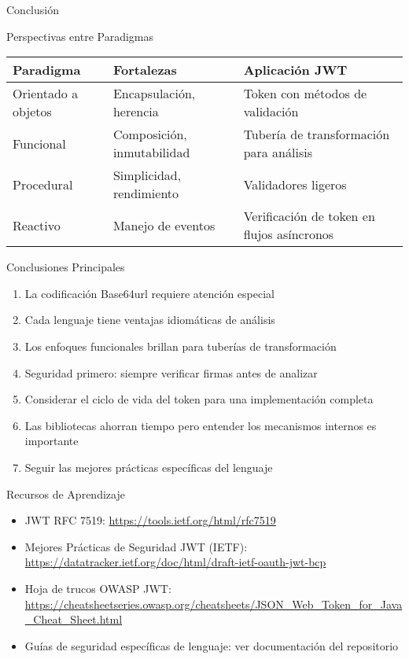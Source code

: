 \documentclass[presentation,aspectratio=169]{beamer}
\begin{document}
\begin{frame}[label={sec:org8853002},fragile]{Conclusión}
 \begin{block}{Perspectivas entre Paradigmas}
\begin{center}
\begin{tabular}{lll}
Paradigma & Fortalezas & Aplicación JWT\\
\hline
Orientado a objetos & Encapsulación, herencia & Token con métodos de validación\\
Funcional & Composición, inmutabilidad & Tubería de transformación para análisis\\
Procedural & Simplicidad, rendimiento & Validadores ligeros\\
Reactivo & Manejo de eventos & Verificación de token en flujos asíncronos\\
\end{tabular}
\end{center}
\end{block}
\begin{block}{Conclusiones Principales}
\begin{enumerate}[<+->]
\item La codificación Base64url requiere atención especial
\item Cada lenguaje tiene ventajas idiomáticas de análisis
\item Los enfoques funcionales brillan para tuberías de transformación
\item Seguridad primero: siempre verificar firmas antes de analizar
\item Considerar el ciclo de vida del token para una implementación completa
\item Las bibliotecas ahorran tiempo pero entender los mecanismos internos es importante
\item Seguir las mejores prácticas específicas del lenguaje
\end{enumerate}
\end{block}
\begin{block}{Recursos de Aprendizaje}
\begin{itemize}[<+->]
\item JWT RFC 7519: \url{https://tools.ietf.org/html/rfc7519}
\item Mejores Prácticas de Seguridad JWT (IETF): \url{https://datatracker.ietf.org/doc/html/draft-ietf-oauth-jwt-bcp}
\item Hoja de trucos OWASP JWT: \url{https://cheatsheetseries.owasp.org/cheatsheets/JSON\_Web\_Token\_for\_Java\_Cheat\_Sheet.html}
\item Guías de seguridad específicas de lenguaje: ver documentación del repositorio

\end{itemize}
\end{block}
\end{frame}
\end{document}
